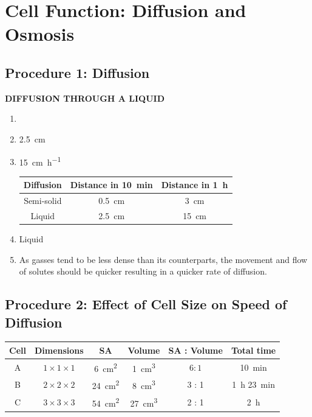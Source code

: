 \documentclass{article}
\begin{document}
\newcommand{\hr}{\par\noindent\rule{\textwidth}{0.4pt}}

\newcommand{\bc}[1]{
	\begin{equation*}
		\begin{boxed}
			{#1}
		\end{boxed}
	\end{equation*}
}

\section{Cell Function: Diffusion and Osmosis}

\subsection{Procedure 1: Diffusion}
\textbf{DIFFUSION THROUGH A LIQUID}
\begin{enumerate}[label=\textbf{\arabic*.}]
	\item
	\item
		\SI{2.5}{\centi \meter}
	\item
		\SI{15}{\centi \meter \per \hour} \\
		\begin{tabular}{ c | c | c }
			Diffusion & Distance in \SI{10}{\minute} & Distance in \SI{1}{\hour} \\
			\hline
			Semi-solid & \SI{0.5}{\centi \meter} & \SI{3}{\centi \meter} \\
			Liquid & \SI{2.5}{\centi \meter} & \SI{15}{\centi \meter}
		\end{tabular}
	\item
		Liquid
	\item
		As gasses tend to be less dense than its counterparts, the movement and flow of solutes should be quicker resulting in a quicker rate of diffusion.
\end{enumerate}


\subsection{Procedure 2: Effect of Cell Size on Speed of Diffusion}
\begin{tabular}{ c | c | c | c | c | c }
	Cell & Dimensions & SA & Volume & SA : Volume & Total time \\
	\hline
	A & $ 1 \times 1 \times 1 $ & \SI{6}{\cm \squared} & \SI{1}{\cm \cubed} & $ 6 : 1 $ & \SI{10}{\minute} \\
	B & $ 2 \times 2 \times 2 $ & \SI{24}{\cm \squared} & \SI{8}{\cm \cubed} & 3 : 1 & \SI{1}{\hour} \SI{23}{\minute} \\
	C & $ 3 \times 3 \times 3 $ & \SI{54}{\cm \squared} & \SI{27}{\cm \cubed} & 2 : 1 & \SI{2}{\hour}
\end{tabular}
\end{document}
